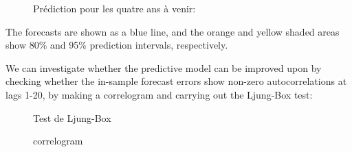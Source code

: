 	\begin{figure}[H]
		\centering
		\caption{Prédiction pour les quatre ans à venir:}
		\label{fig:forecast}
	\end{figure}
	The forecasts are shown as a blue line, and the orange and yellow shaded areas show 80\% and 95\% prediction
intervals, respectively.

\par
We can investigate whether the predictive model can be improved upon by checking whether the in-sample forecast
errors show non-zero autocorrelations at lags 1-20, by making a correlogram and carrying out the Ljung-Box test:
	\begin{figure}[H]
		\centering
		\caption{Test de Ljung-Box}
		\label{fig:Q-test}
	\end{figure}
	
	\begin{figure}[H]
		\centering
		\caption{correlogram}
		\label{fig:correlogram}
	\end{figure}
	
